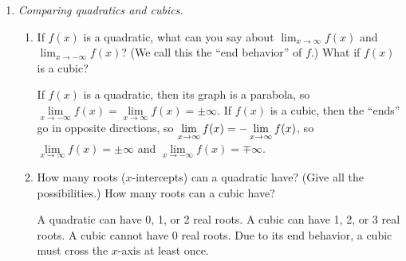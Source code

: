\documentclass{article}
\begin{document}
\begin{enumerate}[resume, topsep=0pt]
\begin{solution}
  \end{solution}

\item  \emph{Comparing quadratics and cubics.}

  \begin{enumerate}
  \item


    \begin{problem}[\vfill]
      If $f(x)$ is a quadratic, what can you say about $\displaystyle \lim_{x \to \infty} f(x)$ and $\displaystyle \lim_{x \to -\infty} f(x)$? (We call this the ``end behavior'' of $f$.) What if $f(x)$ is a cubic?
    \end{problem}

    \begin{solution}
      If $f(x)$ is a quadratic, then its graph is a parabola, so
      $\lim\limits_{x\to-\infty} f(x) = \lim\limits_{x \to \infty} f(x)=
      \pm \infty$. If $f(x)$ is a cubic, then the ``ends'' go in
      opposite directions, so $\lim\limits_{x\to\-\infty} f(x)
      = -\lim\limits_{x\to\infty} f(x)$, so $\lim\limits_{x\to\infty} f(x)
      = \pm \infty$ and $\lim\limits_{x\to-\infty} f(x) = \mp \infty$.
    \end{solution}

  \item


    \begin{problem}[\vfill]
      How many roots ($x$-intercepts) can a quadratic have? (Give all the possibilities.) How many roots can a cubic have? 
    \end{problem}

    \begin{solution}
      A quadratic can have 0, 1, or 2 real roots. A cubic can have
      1, 2, or 3 real roots. A cubic cannot have 0 real roots. Due to
      its end behavior, a cubic must cross the $x$-axis at least once.
    \end{solution}


\end{enumerate}
\end{enumerate}
\end{document}
